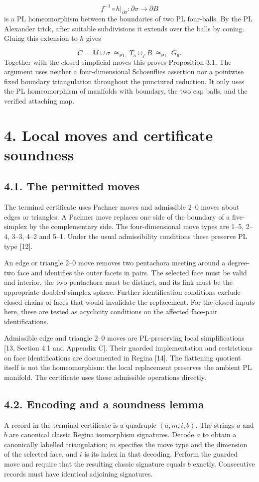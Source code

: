 \documentclass[11pt,letterpaper]{article}
\begin{document}
\[
f^{-1}\circ h|_{\partial\sigma}:\partial\sigma\longrightarrow\partial B
\]
is a PL homeomorphism between the boundaries of two PL four-balls. By the PL Alexander trick, after suitable subdivisions it extends over the balls by coning. Gluing this extension to $h$ gives

\[
C=M\cup\sigma\ \cong_{\mathrm{PL}}\ T_5\cup_f B\ \cong_{\mathrm{PL}}\ G_6.
\]
Together with the closed simplicial moves this proves Proposition 3.1. The argument uses neither a four-dimensional Schoenflies assertion nor a pointwise fixed boundary triangulation throughout the punctured reduction. It only uses the PL homeomorphism of manifolds with boundary, the two cap balls, and the verified attaching map.

\section*{4. Local moves and certificate soundness}
\subsection*{4.1. The permitted moves}
The terminal certificate uses Pachner moves and admissible 2--0 moves about edges or triangles. A Pachner move replaces one side of the boundary of a five-simplex by the complementary side. The four-dimensional move types are 1--5, 2--4, 3--3, 4--2 and 5--1. Under the usual admissibility conditions these preserve PL type [12].

An edge or triangle 2--0 move removes two pentachora meeting around a degree-two face and identifies the outer facets in pairs. The selected face must be valid and interior, the two pentachora must be distinct, and its link must be the appropriate doubled-simplex sphere. Further identification conditions exclude closed chains of faces that would invalidate the replacement. For the closed inputs here, these are tested as acyclicity conditions on the affected face-pair identifications.

Admissible edge and triangle 2--0 moves are PL-preserving local simplifications [13, Section 4.1 and Appendix C]. Their guarded implementation and restrictions on face identifications are documented in Regina [14]. The flattening quotient itself is not the homeomorphism: the local replacement preserves the ambient PL manifold. The certificate uses these admissible operations directly.

\subsection*{4.2. Encoding and a soundness lemma}
A record in the terminal certificate is a quadruple $(a,m,i,b)$. The strings $a$ and $b$ are canonical classic Regina isomorphism signatures. Decode $a$ to obtain a canonically labelled triangulation; $m$ specifies the move type and the dimension of the selected face, and $i$ is its index in that decoding. Perform the guarded move and require that the resulting classic signature equals $b$ exactly. Consecutive records must have identical adjoining signatures.
\end{document}
